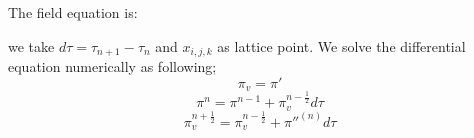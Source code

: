 \documentclass[a4paper,14pt]{article}
\newcommand {\be}{\begin{equation}}
\newcommand {\ee}{\end{equation}}
\begin{document}
The field equation is:

we take $d \tau=\tau_{n+1}-\tau_n $ and $x_{i,j,k} $ as lattice point. We solve the differential equation numerically as following;
\be
\pi_v= {\pi}'
\ee
\be
\pi^{n}= \pi ^{n-1}+\pi_v ^{n-\frac{1}{2}} d \tau
\ee
\be \label{eq3}
\pi_v ^{n+\frac{1}{2}}=\pi_v ^{n-\frac{1}{2}} + {\pi''} ^{(n)}  d \tau
\ee
\end{document}
